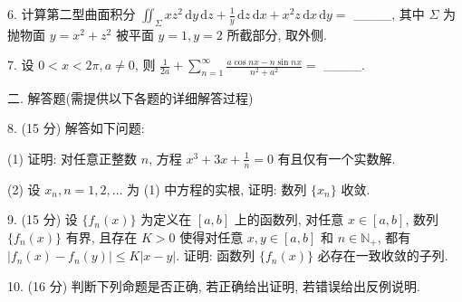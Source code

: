 \documentclass{examcollection}
\begin{document}
{\begin{minipage}{\textwidth}
6. 计算第二型曲面积分 $\iint_{\Sigma} x z^{2} \, \mathrm{d}y \, \mathrm{d}z + \frac{1}{y} \, \mathrm{d}z \, \mathrm{d}x + x^{2} z \, \mathrm{d}x \, \mathrm{d}y =$ \_\_\_\_, 其中 $\Sigma$ 为抛物面 $y = x^{2} + z^{2}$ 被平面 $y = 1, y = 2$ 所截部分, 取外侧.\par
7. 设 $0 < x < 2\pi, a \neq 0$, 则 $\frac{1}{2a} + \sum_{n=1}^{\infty} \frac{a \cos nx - n \sin nx}{n^2 + a^2} =$ \_\_\_\_.\par
二. 解答题(需提供以下各题的详细解答过程)\par
8. (15 分) 解答如下问题:\par
(1) 证明: 对任意正整数 $n$, 方程 $x^{3} + 3x + \frac{1}{n} = 0$ 有且仅有一个实数解.\par
(2) 设 $x_{n}, n = 1,2,\dots$ 为 (1) 中方程的实根, 证明: 数列 $\{x_{n}\}$ 收敛.\par
9. (15 分) 设 $\{f_n(x)\}$ 为定义在 $[a, b]$ 上的函数列, 对任意 $x \in [a, b]$, 数列 $\{f_n(x)\}$ 有界, 且存在 $K > 0$ 使得对任意 $x, y \in [a, b]$ 和 $n \in \mathbb{N}_+$, 都有 $|f_n(x) - f_n(y)| \leq K|x - y|$. 证明: 函数列 $\{f_n(x)\}$ 必存在一致收敛的子列.\par
10. (16 分) 判断下列命题是否正确, 若正确给出证明, 若错误给出反例说明.\par
\end{minipage}}
\ifdim\dimexpr\ht\proofbox+\dp\proofbox\relax>\textheight
\noindent\resizebox{!}{\textheight}{\usebox{\proofbox}}\else\noindent\usebox{\proofbox}\fi\clearpage
\end{document}
